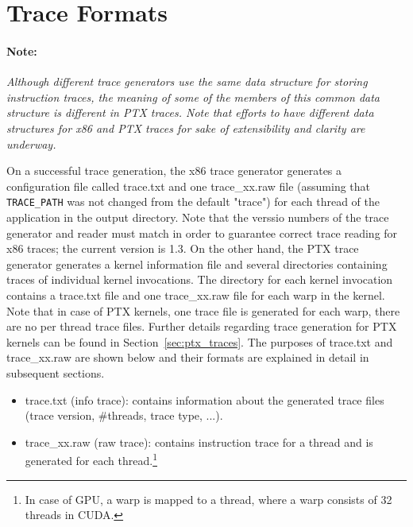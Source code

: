 \section{Trace Formats}
\label{sec:traceformat}

\paragraph{Note:}

\textit{Although different trace generators use the same data structure for
storing instruction traces, the meaning of some of the members of this
common data structure is different in PTX traces. Note that efforts to
have different data structures for x86 and PTX traces for sake of
extensibility and clarity are underway.}


On a successful trace generation, the x86 trace generator generates a
configuration file called trace.txt and one trace\_xx.raw file
(assuming that \Verb+TRACE_PATH+ was not changed from the default "trace") for each thread
of the application in the output directory. Note that the verssio numbers
of the trace generator and reader must match in order to guarantee correct
trace reading for x86 traces; the current version is 1.3. On the other hand, the PTX
trace generator generates a kernel information file and several
directories containing traces of individual kernel invocations. The
directory for each kernel invocation contains a trace.txt file and one
trace\_xx.raw file for each warp in the kernel.  Note that in case of
PTX kernels, one trace file is generated for each warp, there are no
per thread trace files. Further details regarding trace generation for
PTX kernels can be found in Section~\ref{sec:ptx_traces}. The purposes
of trace.txt and trace\_xx.raw are shown below and their formats are
explained in detail in subsequent sections.


\begin{itemize}\itemsep2pt
\item trace.txt (info trace): contains information about the generated
  trace files (trace version, \#threads, trace type, ...).

\item trace\_xx.raw (raw trace): contains instruction trace for a
  thread and is generated for each thread.\footnote{In case of GPU, a
    warp is mapped to a \SIM thread, where a warp consists of 32
    threads in CUDA.}
\end{itemize}



